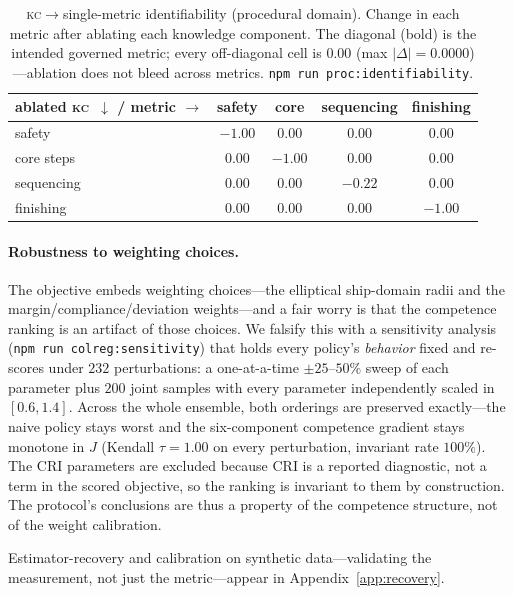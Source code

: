 \documentclass{article}
\newcommand{\kc}{\textsc{kc}}
\begin{document}
\begin{table}[t]
\centering
\small
\begin{tabular}{@{}lcccc@{}}
\toprule
ablated \kc\ $\downarrow$ / metric $\rightarrow$ & safety & core & sequencing & finishing \\
\midrule
safety      & $\mathbf{-1.00}$ & $0.00$ & $0.00$ & $0.00$ \\
core steps  & $0.00$ & $\mathbf{-1.00}$ & $0.00$ & $0.00$ \\
sequencing  & $0.00$ & $0.00$ & $\mathbf{-0.22}$ & $0.00$ \\
finishing   & $0.00$ & $0.00$ & $0.00$ & $\mathbf{-1.00}$ \\
\bottomrule
\end{tabular}
\caption{\kc$\to$single-metric identifiability (procedural domain). Change in each metric
after ablating each knowledge component. The diagonal (bold) is the intended governed
metric; every off-diagonal cell is $0.00$ (max $|\Delta|=0.0000$)---ablation does not bleed
across metrics. \texttt{npm run proc:identifiability}.}
\label{tab:ident}
\end{table}

\paragraph{Robustness to weighting choices.} The objective embeds weighting choices---the
elliptical ship-domain radii and the margin/compliance/deviation weights---and a fair worry
is that the competence ranking is an artifact of those choices. We falsify this with a
sensitivity analysis (\texttt{npm run colreg:sensitivity}) that holds every policy's
\emph{behavior} fixed and re-scores under $232$ perturbations: a one-at-a-time
$\pm25$--$50\%$ sweep of each parameter plus $200$ joint samples with every parameter
independently scaled in $[0.6, 1.4]$. Across the whole ensemble, both orderings are
preserved exactly---the naive policy stays worst and the six-component competence gradient
stays monotone in $J$ (Kendall $\tau=1.00$ on every perturbation, invariant rate $100\%$).
The CRI parameters are excluded because CRI is a reported diagnostic, not a term in the
scored objective, so the ranking is invariant to them by construction. The protocol's
conclusions are thus a property of the competence structure, not of the weight calibration.

Estimator-recovery and calibration on synthetic data---validating the measurement, not just the
metric---appear in Appendix~\ref{app:recovery}.
\end{document}

